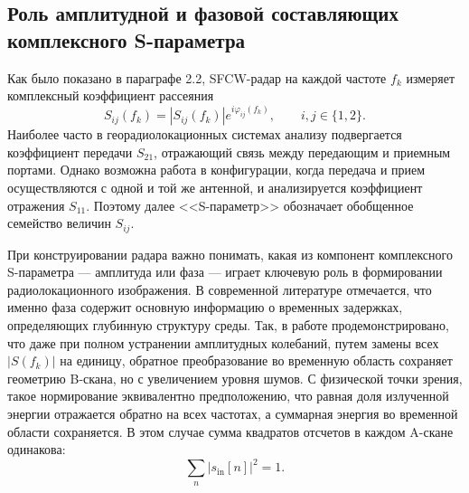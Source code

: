 \subsection{Роль амплитудной и фазовой составляющих комплексного S-параметра}

Как было показано в параграфе 2.2, SFCW-радар на каждой частоте $f_k$ измеряет комплексный коэффициент рассеяния
\begin{equation}
    S_{ij}(f_k) = |S_{ij}(f_k)| e^{i\varphi_{ij}(f_k)}, \qquad i,j \in \{1,2\}.
\end{equation}
Наиболее часто в георадиолокационных системах анализу подвергается коэффициент передачи $S_{21}$, отражающий связь между передающим и приемным портами. Однако возможна работа в конфигурации, когда передача и прием осуществляются с одной и той же антенной, и анализируется коэффициент отражения $S_{11}$. Поэтому далее <<S-параметр>> обозначает обобщенное семейство величин $S_{ij}$.

При конструировании радара важно понимать, какая из компонент комплексного S-параметра --- амплитуда или фаза --- играет ключевую роль в формировании радиолокационного изображения. В современной литературе отмечается, что именно фаза содержит основную информацию о временных задержках, определяющих глубинную структуру среды. Так, в работе \cite{eide2019advanced} продемонстрировано, что даже при полном устранении амплитудных колебаний, путем замены всех $|S(f_k)|$ на единицу, обратное преобразование во временную область сохраняет геометрию B-скана, но с увеличением уровня шумов. С физической точки зрения, такое нормирование эквивалентно предположению, что равная доля излученной энергии отражается обратно на всех частотах, а суммарная энергия во временной области сохраняется. В этом случае сумма квадратов отсчетов в каждом A-скане одинакова:
\begin{equation}
    \sum_n |s_{\mathrm{in}}[n]|^2 = 1.
\end{equation}

